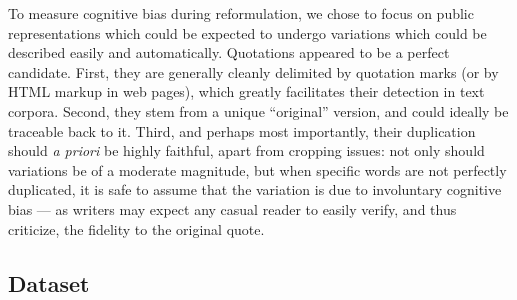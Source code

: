 
To measure cognitive bias during reformulation, we chose to focus on public representations which could be expected to undergo variations which could be described easily and automatically.
Quotations appeared to be a perfect candidate. First, they are generally cleanly delimited by quotation marks (or by HTML markup in web pages), which greatly facilitates their detection in text corpora. Second, they stem from a unique ``original'' version, and could ideally be traceable back to it.
Third, and perhaps most importantly, their duplication should \emph{a priori} be highly faithful, apart from cropping issues: not only should variations be of a moderate magnitude, but when specific words are not perfectly duplicated, it is safe to assume that the variation is due to involuntary cognitive bias --- as writers may expect any casual reader to easily verify, and thus criticize, the fidelity to the original quote.

\subsection{Dataset} %



